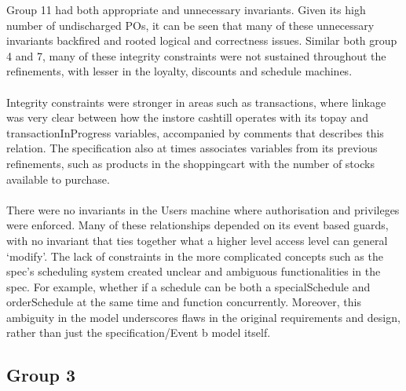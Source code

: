 Group 11 had both appropriate and unnecessary invariants. Given its high number of undischarged POs, it can be seen that many of these unnecessary invariants backfired and rooted logical and correctness issues. Similar both group 4 and 7, many of these integrity constraints were not sustained throughout the refinements, with lesser in the loyalty, discounts and schedule machines.
 \\ \\ Integrity constraints were stronger in areas such as transactions, where linkage was very clear between how the instore cashtill operates with its topay and transactionInProgress variables, accompanied by comments that describes this relation. The specification also at times associates variables from its previous refinements, such as products in the shoppingcart with the number of stocks available to purchase.
 \\ \\ There were no invariants in the Users machine where authorisation and privileges were enforced. Many of these relationships depended on its event based guards, with no invariant that ties together what a higher level access level can general ‘modify’. The lack of constraints in the more complicated concepts such as the spec’s scheduling system created unclear and ambiguous functionalities in the spec. For example, whether if a schedule can be both a specialSchedule and orderSchedule at the same time and function concurrently. Moreover, this ambiguity in the model underscores flaws in the original requirements and design, rather than just the specification\slash Event b model itself.

\subsection{Group 3}
\label{group3}

